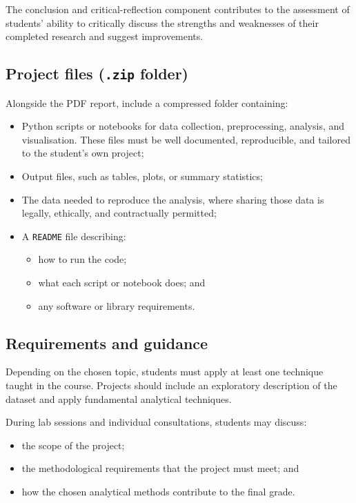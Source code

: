 The conclusion and critical-reflection component contributes to the assessment of students' ability to critically discuss the strengths and weaknesses of their completed research and suggest improvements.

\subsection*{Project files (\texttt{.zip} folder)}

Alongside the PDF report, include a compressed folder containing:
\begin{itemize}
    \item Python scripts or notebooks for data collection, preprocessing, analysis, and visualisation. These files must be well documented, reproducible, and tailored to the student's own project;
    \item Output files, such as tables, plots, or summary statistics;
    \item The data needed to reproduce the analysis, where sharing those data is legally, ethically, and contractually permitted;
    \item A \texttt{README} file describing:
    \begin{itemize}
        \item how to run the code;
        \item what each script or notebook does; and
        \item any software or library requirements.
    \end{itemize}
\end{itemize}

\subsection*{Requirements and guidance}

Depending on the chosen topic, students must apply at least one technique taught in the course. Projects should include an exploratory description of the dataset and apply fundamental analytical techniques.

During lab sessions and individual consultations, students may discuss:
\begin{itemize}
    \item the scope of the project;
    \item the methodological requirements that the project must meet; and
    \item how the chosen analytical methods contribute to the final grade.
\end{itemize}

